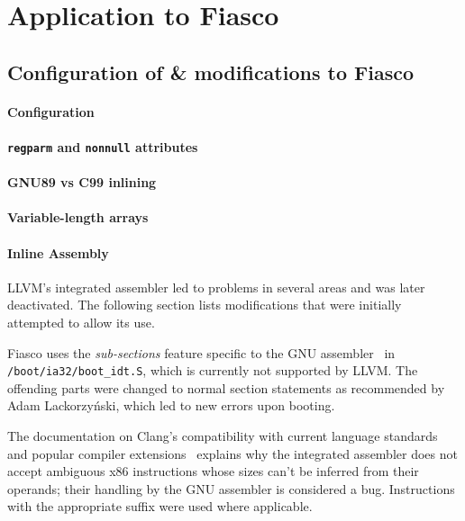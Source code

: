 \section{Application to Fiasco}

\subsection{Configuration of \& modifications to Fiasco}

\paragraph{Configuration}


\paragraph{\texttt{regparm} and \texttt{nonnull} attributes}


\paragraph{GNU89 vs C99 inlining}


\paragraph{Variable-length arrays}


\paragraph{Inline Assembly}

LLVM's integrated assembler led to problems in several areas and was later
deactivated. The following section lists modifications that were initially
attempted to allow its use.

Fiasco uses the \emph{sub-sections} feature specific to the GNU
assembler~\cite{gas-subsections} in \texttt{/boot\-/ia32\-/boot\_idt.S}, which
is currently not supported by LLVM. The offending parts were changed to normal
section statements as recommended by Adam
Lackorzyński, which led to new errors upon booting.

The documentation on Clang's compatibility with current language standards and
popular compiler extensions~\cite[Inline assembly]{clang-compatibility}
explains why the integrated assembler does not accept ambiguous x86
instructions whose sizes can't be inferred from their operands; their handling
by the GNU assembler is considered a bug. Instructions with the appropriate
suffix were used where applicable.

